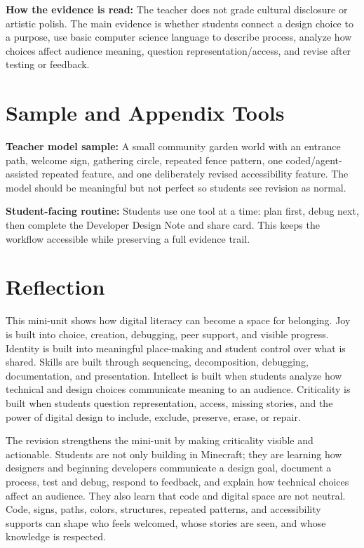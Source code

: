 \textcolor{LessonTwoAccent}{\textbf{How the evidence is read:} The teacher does not grade cultural disclosure or artistic polish. The main evidence is whether students connect a design choice to a purpose, use basic computer science language to describe process, analyze how choices affect audience meaning, question representation/access, and revise after testing or feedback.}

\section*{Sample and Appendix Tools}

\textbf{Teacher model sample:} A small community garden world with an entrance path, welcome sign, gathering circle, repeated fence pattern, one coded/agent-assisted repeated feature, and one deliberately revised accessibility feature. The model should be meaningful but not perfect so students see revision as normal.

\textbf{Student-facing routine:} \textcolor{LessonTwoAccent}{Students use one tool at a time: plan first, debug next, then complete the Developer Design Note and share card. This keeps the workflow accessible while preserving a full evidence trail.}

\newpage
\section*{Reflection}

This mini-unit shows how digital literacy can become a space for belonging. Joy is built into choice, creation, debugging, peer support, and visible progress. Identity is built into meaningful place-making and student control over what is shared. Skills are built through sequencing, decomposition, debugging, documentation, and presentation. Intellect is built when students analyze how technical and design choices communicate meaning to an audience. \textcolor{LessonTwoAccent}{Criticality is built when students question representation, access, missing stories, and the power of digital design to include, exclude, preserve, erase, or repair.}

\textcolor{LessonTwoAccent}{The revision strengthens the mini-unit by making criticality visible and actionable. Students are not only building in Minecraft; they are learning how designers and beginning developers communicate a design goal, document a process, test and debug, respond to feedback, and explain how technical choices affect an audience. They also learn that code and digital space are not neutral. Code, signs, paths, colors, structures, repeated patterns, and accessibility supports can shape who feels welcomed, whose stories are seen, and whose knowledge is respected.}

